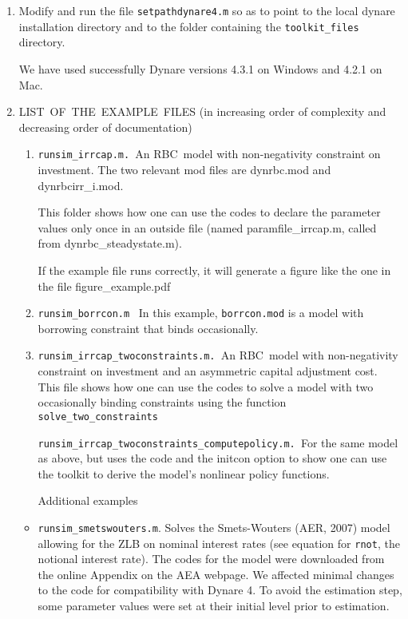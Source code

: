 \documentclass[12pt]{article}
\begin{document}
\begin{enumerate}
\item Modify and run the file \texttt{setpathdynare4.m} so as to point to
the local dynare installation directory and to the folder containing the 
\texttt{toolkit\_files} directory.

We have used successfully Dynare versions 4.3.1 on Windows and 4.2.1 on Mac.

\item LIST\ OF\ THE\ EXAMPLE\ FILES (in increasing order of complexity and
decreasing order of documentation)

\begin{enumerate}
\item \texttt{runsim\_irrcap.m. }An RBC\ model with non-negativity
constraint on investment. The two relevant mod files are dynrbc.mod and
dynrbcirr\_i.mod.

This folder shows how one can use the codes to declare the parameter values
only once in an outside file (named paramfile\_irrcap.m, called from
dynrbc\_steadystate.m).

If the example file runs correctly, it will generate a figure like the one
in the file figure\_example.pdf

\item \texttt{runsim\_borrcon.m} \ In this example, \texttt{borrcon.mod} is
a model with borrowing constraint that binds occasionally.

\item \texttt{runsim\_irrcap\_twoconstraints.m. }An RBC\ model with
non-negativity constraint on investment and an asymmetric capital adjustment
cost. This file shows how one can use the codes to solve a model with two
occasionally binding constraints using the function \texttt{%
solve\_two\_constraints}

\texttt{runsim\_irrcap\_twoconstraints\_computepolicy.m. }For the same model
as above, but uses the code and the initcon option to show one can use the
toolkit to derive the model's nonlinear policy functions.

Additional examples
\end{enumerate}

\begin{itemize}
\item \texttt{runsim\_smetswouters.m}. Solves the Smets-Wouters (AER, 2007)
model allowing for the ZLB on nominal interest rates (see equation for 
\texttt{rnot}, the notional interest rate). The codes for the model were
downloaded from the online Appendix on the AEA webpage. We affected minimal
changes to the code for compatibility with Dynare 4. To avoid the estimation
step, some parameter values were set at their initial level prior to
estimation.


\end{itemize}
\end{enumerate}
\end{document}
